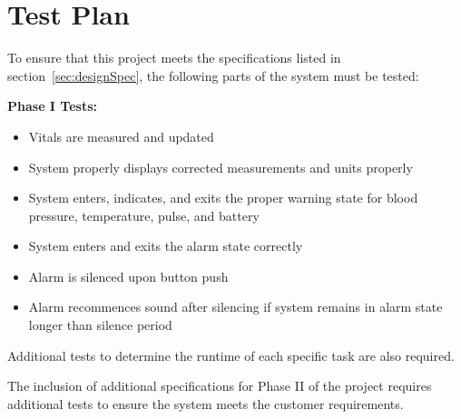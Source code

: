 \documentclass[12pt]{article} %
\begin{document}
    \section{Test Plan} 

    To ensure that this project meets the specifications listed in 
    section~\ref{sec:designSpec}, the following parts of the system must be 
    tested: 

		\textbf{Phase I Tests:}
    \begin{itemize}
      \item Vitals are measured and updated
      \item System properly displays corrected measurements and units properly
      \item System enters, indicates, and exits the proper warning state for
	blood pressure, temperature, pulse, and battery
      \item System enters and exits the alarm state correctly
      \item Alarm is silenced upon button push
      \item Alarm recommences sound after silencing if system remains in alarm
	state longer than silence period
    \end{itemize}

    Additional tests to determine the runtime of each specific task are also
    required.

    The inclusion of additional specifications for Phase II of the project
    requires additional tests to ensure the system meets the customer
    requirements.
\end{document}
